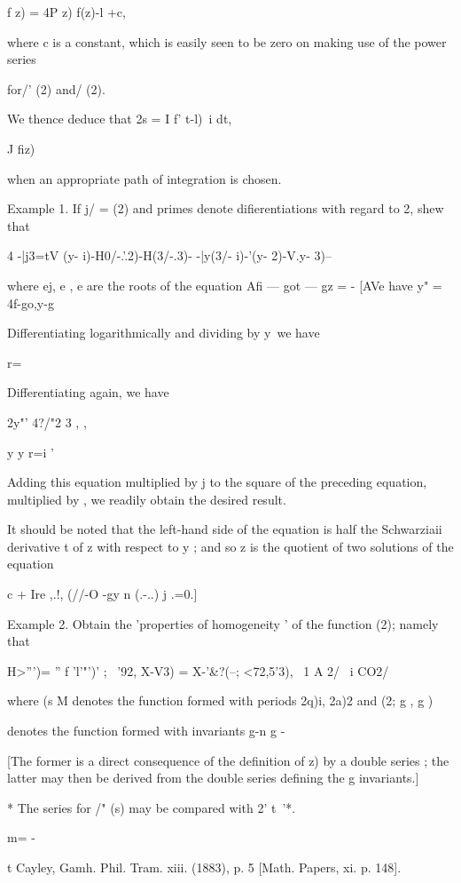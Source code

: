 {f z) = 4P z) f(z)-l +c,

where c is a constant, which is easily seen to be zero on making use
of the power series

for/' (2) and/ (2).

We thence deduce that 2s = I f' t-l)~i dt,

J fiz)

when an appropriate path of integration is chosen.

Example 1. If j/ = (2) and primes denote difierentiations with regard
to 2, shew that

4 -|j3=tV (y- i)-H0/-.'.2)-H(3/-.3)- -|y(3/- i)-'(y- 2)-V.y- 3)--\

where ej, e , e are the roots of the equation Afi — got — gz = - [AVe
have y" = 4f-go,y-g

Differentiating logarithmically and dividing by y\ we have

r=\

Differentiating again, we have

2y"' 4?/"2 3 , ,

y y r=i '

Adding this equation multiplied by j to the square of the preceding
equation, multiplied by , we readily obtain the desired result.

It should be noted that the left-hand side of the equation is half the
Schwarziaii derivative t of z with respect to y ; and so z is the
quotient of two solutions of the equation

c + Ire ,.!, (//-O -gy n (.-..) j .=0.]

Example 2. Obtain the 'properties of homogeneity ' of the function
(2); namely that

 H>''')= '' f 'l'"')' ; ~'92, X-V3) = X-'\&?(--; <72,5'3), \ 1 A 2/ \
i CO2/

where (s M denotes the function formed with periods 2q)i, 2a)2 and (2;
g , g )

denotes the function formed with invariants g-n g -

[The former is a direct consequence of the definition of z) by a
double series ; the latter may then be derived from the double series
defining the g invariants.]

* The series for /" (s) may be compared with 2' t~'*.

m= -

t Cayley, Gamh. Phil. Tram. xiii. (1883), p. 5 [Math. Papers, xi. p.
148].



}
